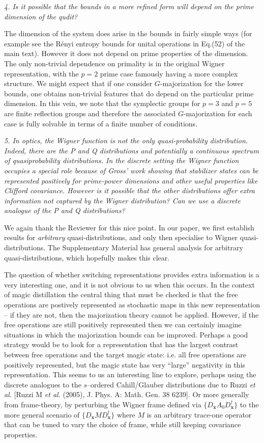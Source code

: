 \documentclass[11pt]{letter}
\def\x{\boldsymbol{x}}
\begin{document}
\textit{4. Is it possible that the bounds in a more refined form will depend on the prime dimension of the qudit?}

The dimension of the system does arise in the bounds in fairly simple ways (for example see the R\'{e}nyi entropy bounds for unital operations in Eq.(52) of the main text).  However it does not depend on prime properties of the dimension.  The only non-trivial dependence on primality is in the original Wigner representation,  with the $p=2$ prime case famously having a more complex structure.  We might expect that if one consider $G$-majorization for the lower bounds,  one obtains non-trivial features that do depend on the particular prime dimension.  In this vein,  we note that the symplectic groups for $p=3$ and $p=5$ are finite reflection groups and therefore the associated $G$-majorization for each case is fully solvable in terms of a finite number of conditions.


\textit{5. In optics, the Wigner function is not the only quasi-probability distribution. Indeed, there are the P and Q distributions and potentially a continuous spectrum of quasiprobability distributions. In the discrete setting the Wigner function occupies a special role because of Gross' work showing that stabilizer states can be represented positively for prime-power dimensions and other useful properties like Clifford covariance. However is it possible that the other distributions offer extra information not captured by the Wigner distribution? Can we use a discrete analogue of the P and Q distributions?}

We again thank the Reviewer for this nice point. In our paper, we first establish results for \emph{arbitrary} quasi-distributions,  and only then specialise to Wigner quasi-distributions. The Supplementary Material has general analysis for arbitrary quasi-distributions, which hopefully makes this clear.

The question of whether switching representations provides extra information is a very interesting one,  and it is not obvious to us when this occurs.  In the context of magic distillation the central thing that must be checked is that the free operations are postively represented as stochastic maps in this new representation -- if they are not,  then the majorization theory cannot be applied.  However, if the free operations are still positively represented then we can certainly imagine situations in which the majorization bounds can be improved.  Perhaps a good strategy would be to look for a representation that has the largest contrast between free operations and the target magic state: i.e.  all free operations are positively represented,  but the magic state has very ``large'' negativity in this representation.  This seems to us an interesting line to explore,  perhaps using the discrete analogues to the $s$--ordered Cahill/Glauber distributions due to Ruzzi \textit{et al.} [Ruzzi M \textit{et al.} (2005),  J. Phys. A: Math. Gen. 38 6239].  Or more generally from frame-theory, by perturbing the Wigner frame defined via $\{D_{\x}A_0 D_{\x}^\dagger\}$ to the more general scenario of $\{D_{\x} M D_{\x}^\dagger\}$ where $M$ is an arbitrary trace-one operator that can be tuned to vary the choice of frame,  while still keeping covariance properties.
\end{document}
